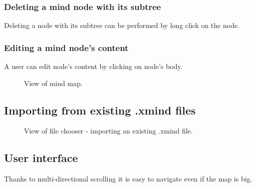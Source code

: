 \subsubsection{Deleting a mind node with its subtree}
\label{subsubsec:delete-node}
 Deleting a node with its subtree can be performed by long click on the node. 
 
\subsubsection{Editing a mind node's content}
\label{subsubsec:delete-node}
A user can edit node's content by clicking on node's body.

\begin{figure}[h]
	\centering
	\caption{View of mind map.}
	\label{fig:screen-map}
\end{figure}

\subsection{Importing from existing .xmind files}
\label{subsec:import}

\begin{figure}[h]
	\centering
	\caption{View of file chooser - importing an existing .xmind file.}
	\label{fig:screen-filechooser}
\end{figure}


\subsection{User interface}
\label{subsec:ui}
Thanks to multi-directional scrolling it is easy to navigate even if the map is big.

